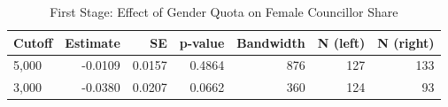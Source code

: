 \begin{table}[!h]
\centering
\caption{\label{tab:first_stage}First Stage: Effect of Gender Quota on Female Councillor Share}
\centering
\begin{tabular}[t]{lrrrrrr}
\toprule
Cutoff & Estimate & SE & p-value & Bandwidth & N (left) & N (right)\\
\midrule
5,000 & -0.0109 & 0.0157 & 0.4864 & 876 & 127 & 133\\
3,000 & -0.0380 & 0.0207 & 0.0662 & 360 & 124 & 93\\
\bottomrule
\end{tabular}
\end{table}
